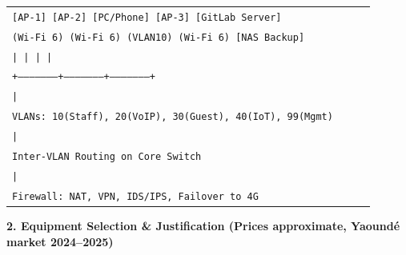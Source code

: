 \documentclass[11pt]{article}
\begin{document}
\begin{exoresolu}
\begin{center}
\begin{tabular}{|p{0.9\linewidth}|}
\texttt{[AP-1]           [AP-2]    [PC/Phone]  [AP-3]               [GitLab Server]}\\
\texttt{(Wi-Fi 6)        (Wi-Fi 6)  (VLAN10)   (Wi-Fi 6)             [NAS Backup]}\\
\texttt{\hspace{0.5cm}|                     |                     |                     |}\\
\texttt{\hspace{0.5cm}+---------------------+---------------------+---------------------+}\\
\texttt{\hspace{3.5cm}|}\\
\texttt{\hspace{3.5cm}VLANs: 10(Staff), 20(VoIP), 30(Guest), 40(IoT), 99(Mgmt)}\\
\texttt{\hspace{3.5cm}|}\\
\texttt{\hspace{3.5cm}Inter-VLAN Routing on Core Switch}\\
\texttt{\hspace{3.5cm}|}\\
\texttt{\hspace{3.5cm}Firewall: NAT, VPN, IDS/IPS, Failover to 4G}\\\hline
\end{tabular}
\end{center}

\textbf{2. Equipment Selection \& Justification (Prices approximate, Yaoundé market 2024–2025)}


\end{exoresolu}
\end{document}
